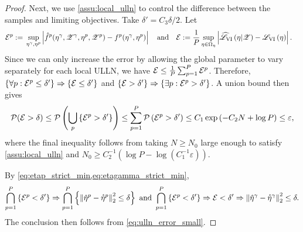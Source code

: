 \begin{proof}
Next, we use \cref{assu:local_ulln} to control the  difference between the
samples and limiting objectives. Take $\delta' = C_3 \delta / 2$.
Let
%
\begin{align*}
%
\err^p :={}& \sup_{\eta^\gamma, \eta^p} \abs{\fhat^p(\eta^\gamma,
\Z^\gamma, \eta^p, \Z^p) - \f^p(\eta^\gamma, \eta^p)}
\quad\textrm{and}\quad
\err :={}
\frac{1}{P} \sup_{\eta \in \etadom} \abs{ \klobj{\eta | \Z} -  \klfullobj{\eta}}.
%
\end{align*}
%
Since we can only increase the error by allowing the global parameter to vary
separately for each local ULLN, we have $\mathcal{E} \le \frac{1}{P} \sum_{p=1}^{P} \mathcal{E}^p$.
Therefore, $\{\forall p: \mathcal{E}^p \le \delta'\} \Rightarrow \{ \mathcal{E} \le \delta' \}$
and $\{ \mathcal{E} > \delta' \} \Rightarrow \{\exists p: \mathcal{E}^p > \delta' \}$.
A union bound then gives
%
\begin{align}\label{eq:ulln_error_small}
%
\p(\err > \delta) \le
\p\left(\bigcup_p \left\{ \err^p > \delta' \right\} \right) \le \sump
\p\left(\err^p > \delta' \right)
\le C_1 \exp\left(-C_2 N + \log P \right) \le \varepsilon,
%
\end{align}
%
where the final inequality follows from taking $N \ge N_0$ large enough to
satisfy \cref{assu:local_ulln} and
%
$N_0 \ge C_2^{-1} \left(
\log P - \log \left(C_1^{-1} \varepsilon\right)
\right)$.

By \cref{eq:etap_strict_min,eq:etagamma_strict_min},
%
\begin{align*}
%
\bigcap_{p=1}^P \left\{ \err^p < \delta' \right\}
\Rightarrow \bigcap_{p=1}^P \left\{\norm{\etahat^p - \etastar^p}_2^2 \le \delta
\right\}
\textrm{ and }
\bigcap_{p=1}^P
\left\{ \err^p < \delta' \right\} \Rightarrow \err < \delta' \Rightarrow
\norm{\etahat^\gamma - \etastar^\gamma}_2^2 \le \delta.
%
\end{align*}
%
The conclusion then
follows from \cref{eq:ulln_error_small}.
%
\end{proof}


